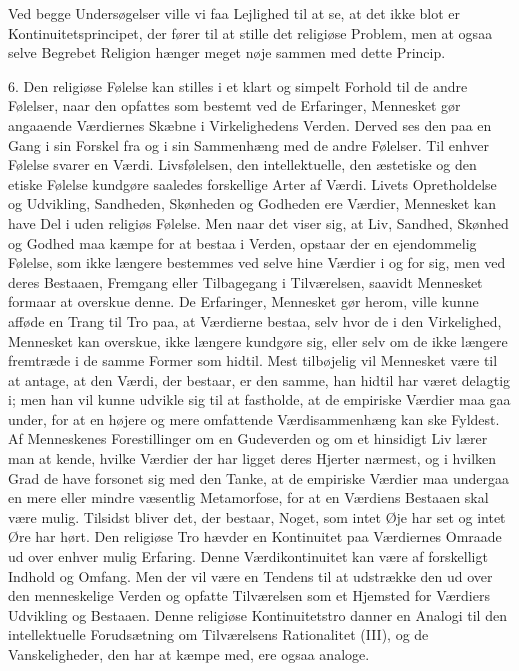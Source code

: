 \documentclass[12pt,a4paper,openany]{book}
\newcommand{\opage}[1]{\marginnote{\footnotesize\textit{[#1]}}}
\begin{document}
Ved begge Undersøgelser ville vi faa Lejlighed til at se, at det ikke blot er
Kontinuitetsprincipet, der fører til at stille det religiøse Problem, men at
ogsaa selve Begrebet Religion hænger meget nøje sammen med dette Princip.

6. Den religiøse Følelse kan stilles i et klart og simpelt Forhold til de andre
Følelser, naar den opfattes som bestemt ved de Erfaringer, Mennesket gør
angaaende Værdiernes Skæbne i Virkelighedens Verden. Derved ses den paa en Gang
i sin Forskel fra og i sin Sammenhæng med de andre Følelser. Til enhver Følelse
svarer en Værdi. Livsfølelsen, den intellektuelle, den æstetiske og den etiske
Følelse kundgøre saaledes forskellige Arter af Værdi. Livets Opretholdelse og
Udvikling, Sandheden, Skønheden og Godheden ere Værdier, Mennesket kan have Del
i uden religiøs Følelse. Men naar det viser sig, at Liv, Sandhed, Skønhed og
Godhed maa kæmpe for at bestaa i Verden, opstaar der en ejendommelig Følelse,
som ikke længere bestemmes ved selve hine Værdier i og for sig, men ved deres
Bestaaen, Fremgang eller Tilbagegang i Tilværelsen, saavidt Mennesket formaar
at overskue denne. De Erfaringer, Mennesket gør herom, ville kunne afføde en
Trang til Tro paa, at Værdierne bestaa, selv hvor de i den Virkelighed,
Mennesket kan overskue, ikke længere kundgøre sig, eller selv om de ikke
længere fremtræde i de samme Former som hidtil. Mest tilbøjelig vil Mennesket
være til at antage, at den Værdi, der bestaar, er den samme, han hidtil har
været delagtig i; men han vil kunne udvikle sig til at fastholde, at de
empiriske Værdier maa gaa under, for at en højere og mere omfattende
Værdisammenhæng kan ske Fyldest. Af Menneskenes Forestillinger om en Gudeverden
og om et hinsidigt Liv lærer man at kende, hvilke Værdier der har ligget deres
Hjerter nærmest, og i hvilken Grad de have forsonet sig med den Tanke, at de
empiriske Værdier maa undergaa en mere eller mindre væsentlig Metamorfose, for
\opage{81}at en Værdiens Bestaaen skal være mulig. Tilsidst bliver det, der
bestaar, Noget, som intet Øje har set og intet Øre har hørt. Den religiøse Tro
hævder en Kontinuitet paa Værdiernes Omraade ud over enhver mulig Erfaring.
Denne Værdikontinuitet kan være af forskelligt Indhold og Omfang. Men der vil
være en Tendens til at udstrække den ud over den menneskelige Verden og opfatte
Tilværelsen som et Hjemsted for Værdiers Udvikling og Bestaaen. Denne religiøse
Kontinuitetstro danner en Analogi til den intellektuelle Forudsætning om
Tilværelsens Rationalitet (III), og de Vanskeligheder, den har at kæmpe med,
ere ogsaa analoge.
\end{document}
